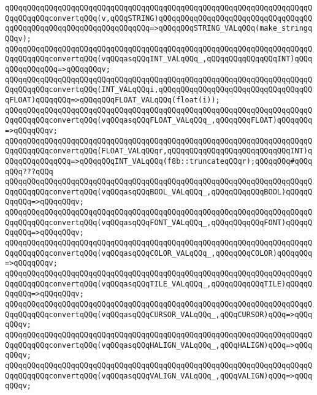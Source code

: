 \verb|qQQqqQQqqQQqqQQqqQQqqQQqqQQqqQQqqQQqqQQqqQQqqQQqqQQqqQQqqQQqqQQqqQQqqQQqqQQqqQQqconvertqQQq(v,qQQqSTRING)qQQqqQQqqQQqqQQqqQQqqQQqqQQqqQQqqQQqqQQqqQQqqQQqqQQqqQQqqQQqqQQqqQQq=>qQQqqQQqSTRING_VALqQQq(make_stringqQQqv);|\newline
\verb|qQQqqQQqqQQqqQQqqQQqqQQqqQQqqQQqqQQqqQQqqQQqqQQqqQQqqQQqqQQqqQQqqQQqqQQqqQQqqQQqconvertqQQq(vqQQqasqQQqINT_VALqQQq_,qQQqqQQqqQQqqQQqINT)qQQqqQQqqQQqqQQq=>qQQqqQQqv;|\newline
\verb|qQQqqQQqqQQqqQQqqQQqqQQqqQQqqQQqqQQqqQQqqQQqqQQqqQQqqQQqqQQqqQQqqQQqqQQqqQQqqQQqconvertqQQq(INT_VALqQQqi,qQQqqQQqqQQqqQQqqQQqqQQqqQQqqQQqqQQqFLOAT)qQQqqQQq=>qQQqqQQqFLOAT_VALqQQq(float(i));|\newline
\verb|qQQqqQQqqQQqqQQqqQQqqQQqqQQqqQQqqQQqqQQqqQQqqQQqqQQqqQQqqQQqqQQqqQQqqQQqqQQqqQQqconvertqQQq(vqQQqasqQQqFLOAT_VALqQQq_,qQQqqQQqFLOAT)qQQqqQQq=>qQQqqQQqv;|\newline
\verb|qQQqqQQqqQQqqQQqqQQqqQQqqQQqqQQqqQQqqQQqqQQqqQQqqQQqqQQqqQQqqQQqqQQqqQQqqQQqqQQqconvertqQQq(FLOAT_VALqQQqr,qQQqqQQqqQQqqQQqqQQqqQQqqQQqINT)qQQqqQQqqQQqqQQq=>qQQqqQQqINT_VALqQQq(f8b::truncateqQQqr);qQQqqQQq#qQQqqQQq???qQQq|\newline
\verb|qQQqqQQqqQQqqQQqqQQqqQQqqQQqqQQqqQQqqQQqqQQqqQQqqQQqqQQqqQQqqQQqqQQqqQQqqQQqqQQqconvertqQQq(vqQQqasqQQqBOOL_VALqQQq_,qQQqqQQqqQQqBOOL)qQQqqQQqqQQq=>qQQqqQQqv;|\newline
\verb|qQQqqQQqqQQqqQQqqQQqqQQqqQQqqQQqqQQqqQQqqQQqqQQqqQQqqQQqqQQqqQQqqQQqqQQqqQQqqQQqconvertqQQq(vqQQqasqQQqFONT_VALqQQq_,qQQqqQQqqQQqFONT)qQQqqQQqqQQq=>qQQqqQQqv;|\newline
\verb|qQQqqQQqqQQqqQQqqQQqqQQqqQQqqQQqqQQqqQQqqQQqqQQqqQQqqQQqqQQqqQQqqQQqqQQqqQQqqQQqconvertqQQq(vqQQqasqQQqCOLOR_VALqQQq_,qQQqqQQqCOLOR)qQQqqQQq=>qQQqqQQqv;|\newline
\verb|qQQqqQQqqQQqqQQqqQQqqQQqqQQqqQQqqQQqqQQqqQQqqQQqqQQqqQQqqQQqqQQqqQQqqQQqqQQqqQQqconvertqQQq(vqQQqasqQQqTILE_VALqQQq_,qQQqqQQqqQQqTILE)qQQqqQQqqQQq=>qQQqqQQqv;|\newline
\verb|qQQqqQQqqQQqqQQqqQQqqQQqqQQqqQQqqQQqqQQqqQQqqQQqqQQqqQQqqQQqqQQqqQQqqQQqqQQqqQQqconvertqQQq(vqQQqasqQQqCURSOR_VALqQQq_,qQQqCURSOR)qQQq=>qQQqqQQqv;|\newline
\verb|qQQqqQQqqQQqqQQqqQQqqQQqqQQqqQQqqQQqqQQqqQQqqQQqqQQqqQQqqQQqqQQqqQQqqQQqqQQqqQQqconvertqQQq(vqQQqasqQQqHALIGN_VALqQQq_,qQQqHALIGN)qQQq=>qQQqqQQqv;|\newline
\verb|qQQqqQQqqQQqqQQqqQQqqQQqqQQqqQQqqQQqqQQqqQQqqQQqqQQqqQQqqQQqqQQqqQQqqQQqqQQqqQQqconvertqQQq(vqQQqasqQQqVALIGN_VALqQQq_,qQQqVALIGN)qQQq=>qQQqqQQqv;|\newline
